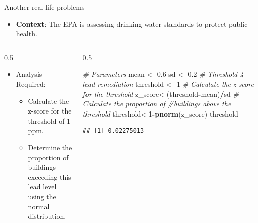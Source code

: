 \documentclass[
  ignorenonframetext,
]{beamer}
\newenvironment{Shaded}{\begin{snugshade}}{\end{snugshade}}
\newcommand{\CommentTok}[1]{\textcolor[rgb]{0.56,0.35,0.01}{\textit{#1}}}
\newcommand{\DecValTok}[1]{\textcolor[rgb]{0.00,0.00,0.81}{#1}}
\newcommand{\FloatTok}[1]{\textcolor[rgb]{0.00,0.00,0.81}{#1}}
\newcommand{\FunctionTok}[1]{\textcolor[rgb]{0.13,0.29,0.53}{\textbf{#1}}}
\newcommand{\NormalTok}[1]{#1}
\newcommand{\OtherTok}[1]{\textcolor[rgb]{0.56,0.35,0.01}{#1}}
\newcommand{\SpecialCharTok}[1]{\textcolor[rgb]{0.81,0.36,0.00}{\textbf{#1}}}
\providecommand{\tightlist}{%
  \setlength{\itemsep}{0pt}\setlength{\parskip}{0pt}}
\begin{document}
\begin{frame}[fragile]{Another real life problems}
\label{another-real-life-problems-2}
\small

\begin{itemize}
\tightlist
\item
  \textbf{Context}: The EPA is assessing drinking water standards to
  protect public health.\\
\end{itemize}

\begin{columns}[T]
\begin{column}{0.5\linewidth}
\small

\begin{itemize}
\tightlist
\item
  Analysis Required:

  \begin{itemize}
  \tightlist
  \item
    Calculate the z-score for the threshold of 1 ppm.
  \item
    Determine the proportion of buildings exceeding this lead level
    using the normal distribution.\\
  \end{itemize}
\end{itemize}
\end{column}

\begin{column}{0.5\linewidth}
\begin{Shaded}
\begin{Highlighting}[]
\CommentTok{\# Parameters}
\NormalTok{mean }\OtherTok{\textless{}{-}} \FloatTok{0.6}
\NormalTok{sd }\OtherTok{\textless{}{-}} \FloatTok{0.2}
\CommentTok{\# Threshold 4 lead remediation}
\NormalTok{threshold }\OtherTok{\textless{}{-}} \DecValTok{1}
\CommentTok{\# Calculate the z{-}score for the threshold}
\NormalTok{z\_score}\OtherTok{\textless{}{-}}\NormalTok{(threshold}\SpecialCharTok{{-}}\NormalTok{mean)}\SpecialCharTok{/}\NormalTok{sd}
\CommentTok{\# Calculate the proportion of }
\CommentTok{\#buildings above the threshold}
\NormalTok{threshold}\OtherTok{\textless{}{-}}\DecValTok{1}\SpecialCharTok{{-}}\FunctionTok{pnorm}\NormalTok{(z\_score)}
\NormalTok{threshold}
\end{Highlighting}
\end{Shaded}

\begin{verbatim}
## [1] 0.02275013
\end{verbatim}
\end{column}
\end{columns}
\end{frame}

\begin{frame}{}
\label{section}
\end{frame}
\end{document}

